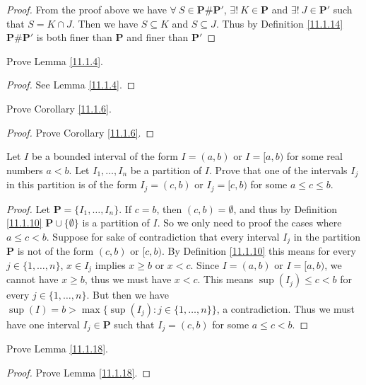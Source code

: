 \begin{proof}
    From the proof above we have \(\forall\ S \in \mathbf{P} \# \mathbf{P}'\), \(\exists!\ K \in \mathbf{P}\) and \(\exists!\ J \in \mathbf{P}'\) such that \(S = K \cap J\).
    Then we have \(S \subseteq K\) and \(S \subseteq J\).
    Thus by Definition \ref{11.1.14} \(\mathbf{P} \# \mathbf{P}'\) is both finer than \(\mathbf{P}\) and finer than \(\mathbf{P}'\)
\end{proof}

\exercisesection

\begin{exercise}\label{ex 11.1.1}
    Prove Lemma \ref{11.1.4}.
\end{exercise}

\begin{proof}
    See Lemma \ref{11.1.4}.
\end{proof}

\begin{exercise}\label{ex 11.1.2}
    Prove Corollary \ref{11.1.6}.
\end{exercise}

\begin{proof}
    Prove Corollary \ref{11.1.6}.
\end{proof}

\begin{exercise}\label{ex 11.1.3}
    Let \(I\) be a bounded interval of the form \(I = (a, b)\) or \(I = [a, b)\) for some real numbers \(a < b\).
    Let \(I_1, \dots, I_n\) be a partition of \(I\).
    Prove that one of the intervals \(I_j\) in this partition is of the form \(I_j = (c, b)\) or \(I_j = [c, b)\) for some \(a \leq c \leq b\).
\end{exercise}

\begin{proof}
    Let \(\mathbf{P} = \{I_1, \dots, I_n\}\).
    If \(c = b\), then \((c, b) = \emptyset\), and thus by Definition \ref{11.1.10} \(\mathbf{P} \cup \{\emptyset\}\) is a partition of \(I\).
    So we only need to proof the cases where \(a \leq c < b\).
    Suppose for sake of contradiction that every interval \(I_j\) in the partition \(\mathbf{P}\) is not of the form \((c, b)\) or \([c, b)\).
    By Definition \ref{11.1.10} this means for every \(j \in \{1, \dots, n\}\), \(x \in I_j\) implies \(x \geq b\) or \(x < c\).
    Since \(I = (a, b)\) or \(I = [a, b)\), we cannot have \(x \geq b\), thus we must have \(x < c\).
    This means \(\sup(I_j) \leq c < b\) for every \(j \in \{1, \dots, n\}\).
    But then we have \(\sup(I) = b > \max\big\{\sup(I_j) : j \in \{1, \dots, n\}\big\}\), a contradiction.
    Thus we must have one interval \(I_j \in \mathbf{P}\) such that \(I_j = (c, b)\) for some \(a \leq c < b\).
\end{proof}

\begin{exercise}\label{ex 11.1.4}
    Prove Lemma \ref{11.1.18}.
\end{exercise}

\begin{proof}
    Prove Lemma \ref{11.1.18}.
\end{proof}